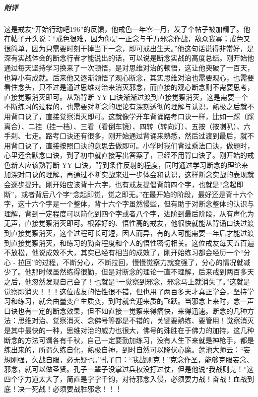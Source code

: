 \begin{case}
    \subparagraph{附评} 这是戒友“开始行动吧196”的反馈，他戒色一年零一月，发了个帖子被加精了。他在帖子开头说：“戒色很难，因为你是一正念与千万邪念作战，敌众我寡；戒色又很简单，因为只需要时刻干掉当下一念，即可戒出生天。”他这句话说得非常好，是深有实战体会的断念行者才能说出的话，可以说是断念实战的高度总结。刚开始他通过每天坚持学习换来了一次顿悟，是对思维对治的顿悟，这让他突破了一百天，也算小有成就。后来他又逐渐领悟了观心断念，其实思维对治也需要观心，也需要看住念头，只不过是通过思维对治来消灭邪念，而直接的观心断念则不需要思考，直接觉察消灭即可。从熟背断 YY 口诀渐渐过渡到直接觉察消灭，这是需要一个不断练习的过程的，也需要对断念的理论有深刻透彻的理解与认识，熟极之后就不用背口诀了，直接觉察消灭即可。这就像学开车背诵路考口诀一样，比如一踩（踩离合）、二挂（挂一档）、三看（看倒车镜）、四转（转向灯）、五按（按喇叭）、六手刹、七走。路考口诀还有很多，刚开始通过背诵来熟悉，然后过渡到最后，就不用背口诀了，直接按照口诀的意思去做即可。小学时我们背过乘法口诀，做题时，心里还会默念口诀，到了初中就直接写出答案了，已经不用背口诀了。刚开始的戒色新人应该熟背断 YY 口诀，背到条件反射的程度，同时通过学习断念的理论来加深对口诀的理解，再通过不断实战来进一步体会和认识，这样断念实战的表现就会逐步提升。刚开始应该背十六字，也有戒友提倡背前四个字，也就是“念起即断”，或者背后八个字“念起即觉，觉之即无。”在最开始的阶段，最好还是背十六个字，这十六个字是一个整体，背十六个字虽然慢些，但有助于对断念整体的认识与理解，背到一定程度可以简化到四个字或者八个字，进阶到最后阶段，从有声化为无声，直接觉察消灭即可。根器好的、悟性高的戒友，他很快就能从背诵口诀过渡到直接觉察消灭，这个过程可长可短，因人而异，有的人可能需要一年后才能过渡到直接觉察消灭，和练习的勤奋程度和个人的悟性密切相关。这位戒友每天五百遍不放松，他说成效不大，其实已经有相当的成效了，刚开始练习都会经历一个“分心 - 拉回”的过程，不断分心，不断拉回，慢慢觉察力就变强了，分心的情况就减少了。他那时候虽然练得很勤，但是对断念的理论一直不理解，后来戒到两百多天之后，他忽然发现自己会了！也就是“一觉察到邪念，邪念马上就消失了。”这就是觉察即消灭！！！这位戒友的悟性很不错，但也用了两百多天才真正学会，坚持学习和练习，就会由量变产生质变，到时就会迎来质的飞跃。当邪念上来时，念一声口诀也有一定的断念效果，但不如直接一觉察来得痛快，来得迅速。断念的几种方法：思维对治、觉察消灭、念佛号等都是不错的，关键要熟练、要管用！觉察消灭是其中最快的一种，思维对治的威力也很大，佛号的殊胜在于佛力的加持，这几种断念的方法可谓各有千秋，自己一定要勤加练习，没有人生下来就是神枪手，都是练出来的，所谓久练自化，熟极自神，到时自然可以降伏心魔。莲池大师云：“妄想刚强，久战自服，必无疑也。”孔子曰：“我战则克！”克念作圣，能够克服妄念、邪念，就可以做圣贤。孔子一辈子没掌过兵权没打过仗，但是他说“我战则克！”这四个字力道太大了，简直是字字千钧，对待邪念入侵，必须要力战！奋战！血战到底！决一死战！必须要战胜邪念！！！
\end{case}

